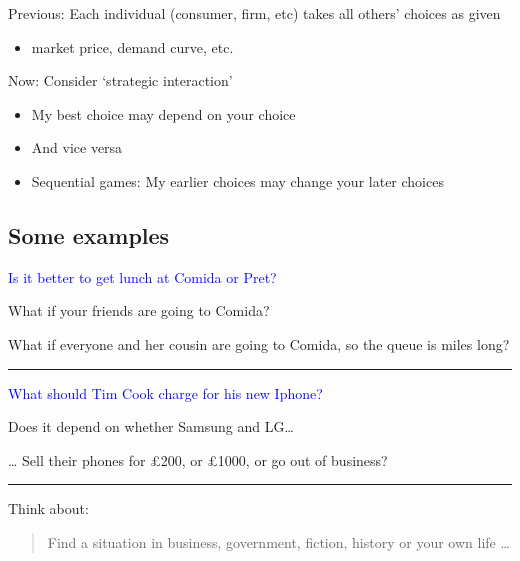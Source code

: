 \documentclass[]{article}
\providecommand{\tightlist}{%
  \setlength{\itemsep}{0pt}\setlength{\parskip}{0pt}}
\begin{document}
Previous: Each individual (consumer, firm, etc) takes all others'
choices as given

\begin{itemize}
\tightlist
\item
  market price, demand curve, etc.
\end{itemize}

\bigskip

Now: Consider `strategic interaction'

\begin{itemize}
\tightlist
\item
  My best choice may depend on your choice
\item
  And vice versa
\item
  Sequential games: My earlier choices may change your later choices
\end{itemize}

\hypertarget{some-examples}{%
\subsection{Some examples}\label{some-examples}}

\textcolor{blue}{Is it better to get lunch at Comida or Pret?}

\bigskip

What if your friends are going to Comida?

\bigskip

What if everyone and her cousin are going to Comida, so the queue is
miles long?

\begin{center}\rule{0.5\linewidth}{\linethickness}\end{center}

\textcolor{blue}{What should Tim Cook charge for his new Iphone?}

\bigskip

Does it depend on whether Samsung and LG\ldots{}

\ldots{} Sell their phones for £200, or £1000, or go out of business?

\begin{center}\rule{0.5\linewidth}{\linethickness}\end{center}

Think about:

\begin{quote}
Find a situation in business, government, fiction, history or your own
life \ldots{}
\end{quote}
\end{document}

